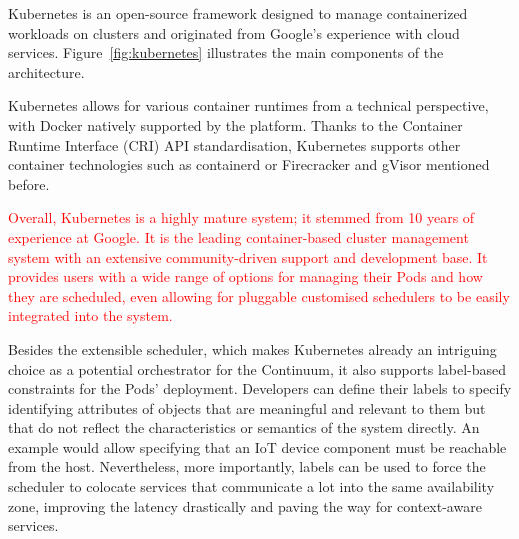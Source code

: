 Kubernetes \cite{kubernetes} is an open-source framework designed to manage containerized workloads on clusters and originated from Google's experience with cloud services. Figure~\ref{fig:kubernetes} illustrates the main components of the architecture.


Kubernetes allows for various container runtimes from a technical perspective, with Docker natively supported by the platform. Thanks to the Container Runtime Interface (CRI) API standardisation, Kubernetes supports other container technologies such as containerd \cite{containerd} or Firecracker and gVisor mentioned before.


\textcolor{red}{Overall, Kubernetes is a highly mature system; it stemmed from 10 years of experience at Google. It is the leading container-based cluster management system with an extensive community-driven support and development base. It provides users with a wide range of options for managing their Pods and how they are scheduled, even allowing for pluggable customised schedulers to be easily integrated into the system.}

Besides the extensible scheduler, which makes Kubernetes already an intriguing choice as a potential orchestrator for the Continuum, it also supports label-based constraints for the Pods' deployment. Developers can define their labels to specify identifying attributes of objects that are meaningful and relevant to them but that do not reflect the characteristics or semantics of the system directly. An example would allow specifying that an IoT device component must be reachable from the host. Nevertheless, more importantly, labels can be used to force the scheduler to colocate services that communicate a lot into the same availability zone, improving the latency drastically and paving the way for context-aware services. %

